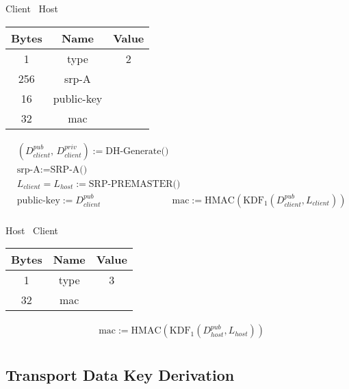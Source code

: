 \begin{center}
    Client \textrightarrow\ Host\\
    \begin{tabular}{|c|c|c|}
        \hline
        \textbf{Bytes} & \textbf{Name} & \textbf{Value} \\
        \hline
        1              & type          & 2              \\
        \hline
        256            & srp-A         &                \\
        \hline
        16             & public-key    &                \\
        \hline
        32             & mac           &                \\
        \hline
    \end{tabular}
\end{center}

\begin{align*}
    & (D_{client}^{pub},\, D_{client}^{priv}) := \text{DH-Generate()}\\
    & \text{srp-A} := \text{SRP-A()}\\
    & L_{client} = L_{host} := \text{SRP-PREMASTER()}\\
    & \text{public-key} := D_{client}^{pub}
    & \text{mac} := \text{HMAC}(\text{KDF}_1(D_{client}^{pub}, L_{client}))\\
\end{align*}

\begin{center}
    Host \textrightarrow\ Client\\
    \begin{tabular}{|c|c|c|}
        \hline
        \textbf{Bytes} & \textbf{Name} & \textbf{Value} \\
        \hline
        1              & type          & 3              \\
        \hline
        32             & mac           &                \\
        \hline
    \end{tabular}
\end{center}

\begin{align*}
    & \text{mac} := \text{HMAC}(\text{KDF}_1(D_{host}^{pub}, L_{host}))\\
\end{align*}

\subsection{Transport Data Key Derivation}

